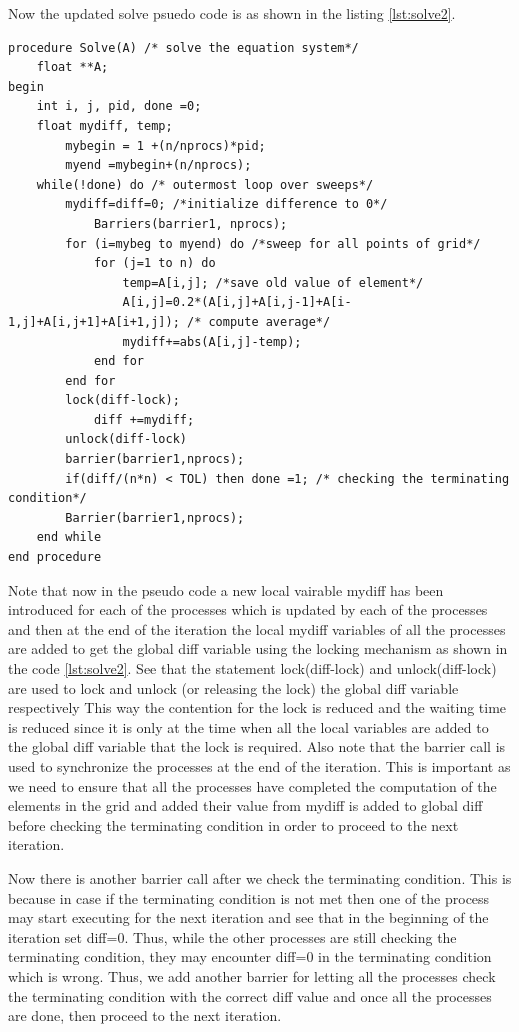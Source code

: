 \documentclass[12pt]{book}
\begin{document}
Now the updated solve psuedo code is as shown in the listing \ref{lst:solve2}.
\begin{lstlisting}[caption={Updated Solve Function},captionpos=b,label={lst:solve2}]
procedure Solve(A) /* solve the equation system*/
    float **A;
begin
    int i, j, pid, done =0;
    float mydiff, temp;
        mybegin = 1 +(n/nprocs)*pid;
        myend =mybegin+(n/nprocs);
    while(!done) do /* outermost loop over sweeps*/
        mydiff=diff=0; /*initialize difference to 0*/
            Barriers(barrier1, nprocs);
        for (i=mybeg to myend) do /*sweep for all points of grid*/
            for (j=1 to n) do
                temp=A[i,j]; /*save old value of element*/
                A[i,j]=0.2*(A[i,j]+A[i,j-1]+A[i-1,j]+A[i,j+1]+A[i+1,j]); /* compute average*/
                mydiff+=abs(A[i,j]-temp);
            end for
        end for
        lock(diff-lock);
            diff +=mydiff;
        unlock(diff-lock)
        barrier(barrier1,nprocs);
        if(diff/(n*n) < TOL) then done =1; /* checking the terminating condition*/
        Barrier(barrier1,nprocs);
    end while
end procedure
\end{lstlisting}
Note that now in the pseudo code a new local vairable mydiff has been introduced for each of the processes
which is updated by each of the processes and then at the end of the iteration the local mydiff variables of all the processes are added to get the global diff variable
using the locking mechanism as shown in the code \ref{lst:solve2}. See that the statement lock(diff-lock) and unlock(diff-lock) are used to lock and unlock (or releasing the lock) 
the global diff variable respectively
This way the contention for the lock is reduced and the waiting time is reduced since it is only at the time when all the
local variables are added to the global diff variable that the lock is required.
Also note that the barrier call is used to synchronize the processes at the end of the iteration. This is important as we need to ensure that all the processes have completed the computation of the elements in the grid and added 
their value from mydiff is added to global diff before checking the terminating condition in order to proceed to the next iteration.

Now there is another barrier call after we check the terminating condition. This is because in case if the terminating condition is not met then one of the process may 
start executing for the next iteration and see that in the beginning of the iteration set diff=0.
Thus, while the other processes are still checking the terminating condition, 
they may encounter diff=0 in the terminating condition which is wrong. Thus, we add another barrier for letting all the processes
check the terminating condition with the correct diff value and once all the processes are done, then proceed to the next iteration.
\end{document}
